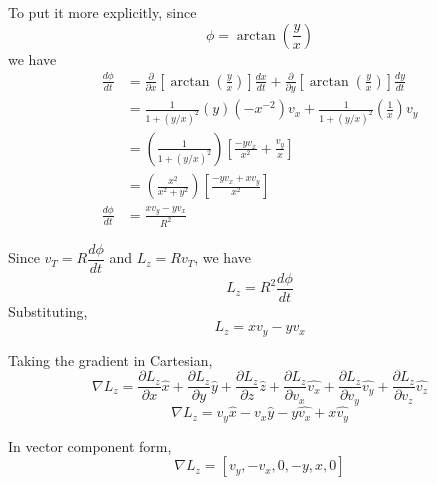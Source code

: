 \documentclass[12pt]{article}
\begin{document}
To put it more explicitly, since
$$ \phi = \arctan \left( \frac{y}{x} \right) $$
we have
\begin{align*}
\frac{d \phi}{dt} &= \frac{\partial}{\partial x} \left[ \arctan \left( \frac{y}{x} \right) \right] \frac{dx}{dt} + \frac{\partial}{\partial y} \left[ \arctan \left( \frac{y}{x} \right) \right] \frac{dy}{dt} \\
&= \frac{1}{1 + (y/x)^2} (y) (-x^{-2}) v_x + \frac{1}{1 + (y/x)^2} (\frac{1}{x}) v_y \\
&= \left( \frac{1}{1 + (y/x)^2} \right) \left[ \frac{-yv_x}{x^2}+\frac{v_y}{x}
  \right] \\
&= \left( \frac{x^2}{x^2 + y^2} \right) \left[ \frac{-yv_x + xv_y}{x^2} \right] \\
\frac{d \phi}{dt} &= \frac{xv_y - yv_x}{R^2}
\end{align*}

Since $v_T = R\dfrac{d \phi}{dt}$ and $L_z = Rv_T$, we have
$$ L_z = R^2\frac{d \phi}{dt} $$
Substituting,
$$ L_z = xv_y - yv_x $$

Taking the gradient in Cartesian,
$$ \nabla L_z = \frac{\partial L_z}{\partial x} \hat{x} + \frac{\partial L_z}{\partial y} \hat{y} +\frac{\partial L_z}{\partial z} \hat{z} + \frac{\partial L_z}{\partial v_x} \hat{v_x} + \frac{\partial L_z}{\partial v_y} \hat{v_y} + \frac{\partial L_z}{\partial v_z} \hat{v_z} $$
$$ \nabla L_z = v_y \hat{x} - v_x \hat{y} -y \hat{v_x} + x \hat{v_y} $$

In vector component form,
$$ \nabla L_z = [v_y, - v_x , 0, -y, x, 0] $$
\end{document}
